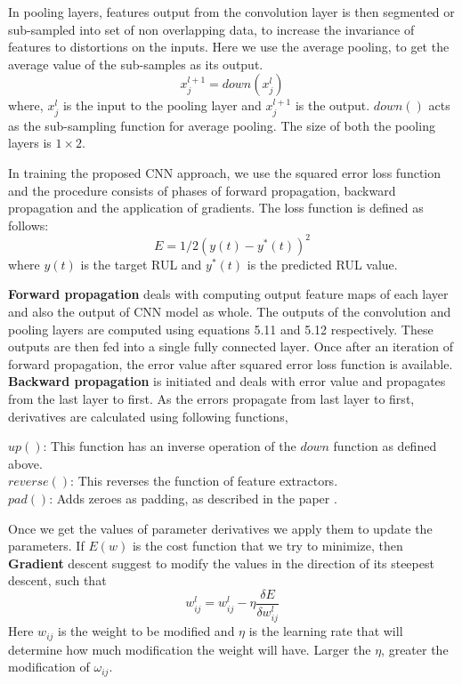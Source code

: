 In pooling layers, features output from the convolution layer is then segmented or sub-sampled into set of non overlapping data, to increase the invariance of features to distortions on the inputs. Here we use the average pooling, to get the average value of the sub-samples as its output.
\begin{equation}
    x_{j}^{l+1} = down(x_{j}^{l})
\end{equation}
where, $x_{j}^{l}$ is the input to the pooling layer and $x_{j}^{l+1}$ is the output. $down()$ acts as the sub-sampling function for average pooling. The size of both the pooling layers is $1 \times 2$.

In training the proposed CNN approach, we use the squared error loss function and the procedure consists of phases of forward propagation, backward propagation and the application of gradients. The loss function is defined as follows:
\begin{equation}
    E = 1/2(y(t) - y^{*}(t))^2
\end{equation}
where $y(t)$ is the target RUL and $y^{*}(t)$ is the predicted RUL value.

\textbf{Forward propagation} deals with computing output feature maps of each layer and also the output of CNN model as whole. The outputs of the convolution and pooling layers are computed using equations 5.11 and 5.12 respectively. These outputs are then fed into a single fully connected layer.
Once after an iteration of forward propagation, the error value after squared error loss function is available. \textbf{Backward propagation} is initiated and deals with error value and propagates from the last layer to first. As the errors propagate from last layer to first, derivatives are calculated using following functions,

$up()$: This function has an inverse operation of the $down$ function as defined above. \\
$reverse()$: This reverses the function of feature extractors. \\
$pad()$: Adds zeroes as padding, as described in the paper \cite{DBLP:conf/dasfaa/BabuZL16}.

Once we get the values of parameter derivatives we apply them to update the parameters. If $E(w)$ is the cost function that we try to minimize, then \textbf{Gradient} descent suggest to modify the values in the direction of its steepest descent, such that
\begin{equation}
    w^{l}_{ij} = w^{l}_{ij} - \eta \frac{\delta{E}}{\delta{w^{l}_{ij}} }
\end{equation}
Here $w_{ij}$ is the weight to be modified and $\eta$ is the learning rate that will determine how much modification the weight will have. Larger the $\eta$, greater the modification of $\omega_{ij}$.

